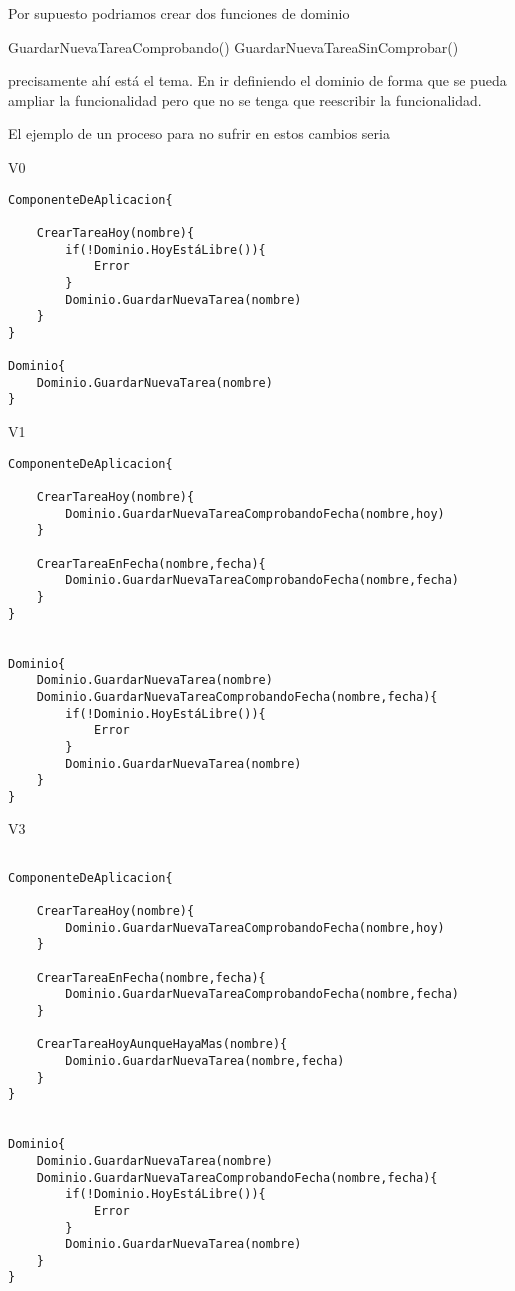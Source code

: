 Por supuesto podriamos crear dos funciones de dominio

GuardarNuevaTareaComprobando()
GuardarNuevaTareaSinComprobar()

precisamente ahí está el tema. En ir definiendo el dominio de forma que se pueda ampliar la funcionalidad pero que no se tenga que reescribir la funcionalidad.

El ejemplo de un proceso para no sufrir en estos cambios seria

V0

\begin{verbatim}
ComponenteDeAplicacion{

    CrearTareaHoy(nombre){
        if(!Dominio.HoyEstáLibre()){
            Error
        }
        Dominio.GuardarNuevaTarea(nombre)
    }
}

Dominio{
    Dominio.GuardarNuevaTarea(nombre)
}

\end{verbatim}

V1

\begin{verbatim}
ComponenteDeAplicacion{

    CrearTareaHoy(nombre){
        Dominio.GuardarNuevaTareaComprobandoFecha(nombre,hoy)
    }

    CrearTareaEnFecha(nombre,fecha){
        Dominio.GuardarNuevaTareaComprobandoFecha(nombre,fecha)
    }
}


Dominio{
    Dominio.GuardarNuevaTarea(nombre)
    Dominio.GuardarNuevaTareaComprobandoFecha(nombre,fecha){
        if(!Dominio.HoyEstáLibre()){
            Error
        }
        Dominio.GuardarNuevaTarea(nombre)
    }
}

\end{verbatim}

V3

\begin{verbatim}

ComponenteDeAplicacion{

    CrearTareaHoy(nombre){
        Dominio.GuardarNuevaTareaComprobandoFecha(nombre,hoy)
    }

    CrearTareaEnFecha(nombre,fecha){
        Dominio.GuardarNuevaTareaComprobandoFecha(nombre,fecha)
    }

    CrearTareaHoyAunqueHayaMas(nombre){
        Dominio.GuardarNuevaTarea(nombre,fecha)
    }
}


Dominio{
    Dominio.GuardarNuevaTarea(nombre)
    Dominio.GuardarNuevaTareaComprobandoFecha(nombre,fecha){
        if(!Dominio.HoyEstáLibre()){
            Error
        }
        Dominio.GuardarNuevaTarea(nombre)
    }
}
\end{verbatim}

